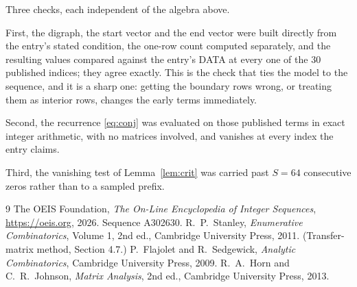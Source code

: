 \documentclass[11pt,a4paper]{article}
\theoremstyle{plain}
\theoremstyle{definition}
\begin{document}
Three checks, each independent of the algebra above.

First, the digraph, the start vector and the end vector were built directly from the
entry's stated condition, the one-row count computed separately, and the resulting values
compared against the entry's DATA at every one of the $30$ published indices; they
agree exactly. This is the check that ties the model to the sequence, and it is a sharp one:
getting the boundary rows wrong, or treating them as interior rows, changes the early terms
immediately.

Second, the recurrence \eqref{eq:conj} was evaluated on those published terms in exact
integer arithmetic, with no matrices involved, and vanishes at every index the entry claims.

Third, the vanishing test of Lemma~\ref{lem:crit} was carried past $S=64$ consecutive
zeros rather than to a sampled prefix.

\begin{thebibliography}{9}
 The OEIS Foundation, \emph{The On-Line Encyclopedia of Integer
Sequences}, \url{https://oeis.org}, 2026. Sequence A302630.
 R.~P.~Stanley, \emph{Enumerative Combinatorics}, Volume 1, 2nd ed.,
Cambridge University Press, 2011. (Transfer-matrix method, Section 4.7.)
 P.~Flajolet and R.~Sedgewick, \emph{Analytic Combinatorics}, Cambridge
University Press, 2009.
 R.~A.~Horn and C.~R.~Johnson, \emph{Matrix Analysis}, 2nd ed., Cambridge
University Press, 2013.
\end{thebibliography}
\end{document}
